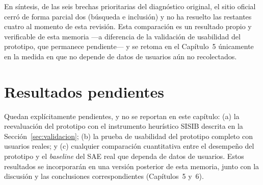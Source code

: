 En síntesis, de las seis brechas prioritarias del diagnóstico original, el sitio oficial cerró de forma parcial dos (búsqueda e inclusión) y no ha resuelto las restantes cuatro al momento de esta revisión. Esta comparación es un resultado propio y verificable de esta memoria —a diferencia de la validación de usabilidad del prototipo, que permanece pendiente— y se retoma en el Capítulo~5 únicamente en la medida en que no depende de datos de usuarios aún no recolectados.

\section{Resultados pendientes}

Quedan explícitamente pendientes, y no se reportan en este capítulo: (a) la reevaluación del prototipo con el instrumento heurístico SISIB descrita en la Sección~\ref{sec:validacion}; (b) la prueba de usabilidad del prototipo completo con usuarios reales; y (c) cualquier comparación cuantitativa entre el desempeño del prototipo y el \emph{baseline} del SAE real que dependa de datos de usuarios. Estos resultados se incorporarán en una versión posterior de esta memoria, junto con la discusión y las conclusiones correspondientes (Capítulos~5 y~6).
